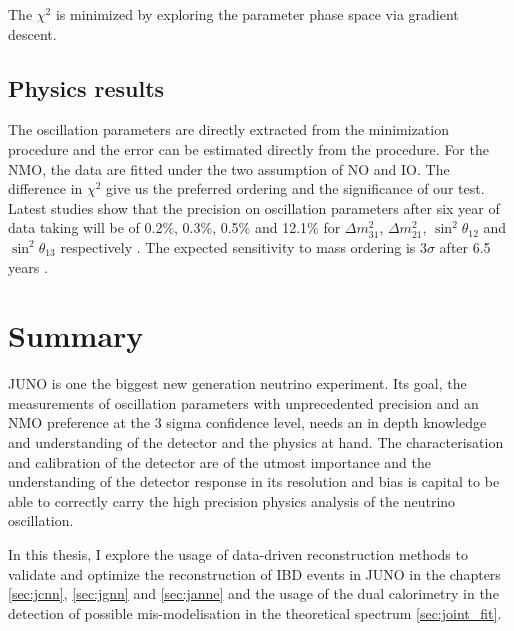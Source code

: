 \documentclass[../main.tex]{subfiles}
\begin{document}
The $\chi^2$ is minimized by exploring the parameter phase space via gradient descent.

\subsection{Physics results}

The oscillation parameters are directly extracted from the minimization procedure and the error can be estimated directly from the procedure. For the NMO, the data are fitted under the two assumption of NO and IO. The difference in $\chi^2$ give us the preferred ordering and the significance of our test. Latest studies show that the precision on oscillation parameters after six year of data taking will be of 0.2\%, 0.3\%, 0.5\% and 12.1\% for $\Delta m^2_{31}$, $\Delta m^2_{21}$, $\sin^2\theta_{12}$ and $\sin^2\theta_{13}$ respectively \cite{juno_collaboration_sub-percent_2022}. The expected sensitivity to mass ordering is $3\sigma$ after 6.5 years \cite{juno_collaboration_juno_2022}.

\section{Summary}

JUNO is one the biggest new generation neutrino experiment. Its goal, the measurements of oscillation parameters with unprecedented precision and an NMO preference at the 3 sigma confidence level, needs an in depth knowledge and understanding of the detector and the physics at hand. The characterisation and calibration of the detector are of the utmost importance and the understanding of the detector response in its resolution and bias is capital to be able to correctly carry the high precision physics analysis of the neutrino oscillation.

In this thesis, I explore the usage of data-driven reconstruction methods to validate and optimize the reconstruction of IBD events in JUNO in the chapters \ref{sec:jcnn}, \ref{sec:jgnn} and \ref{sec:janne} and the usage of the dual calorimetry in the detection of possible mis-modelisation in the theoretical spectrum \ref{sec:joint_fit}.
\end{document}
